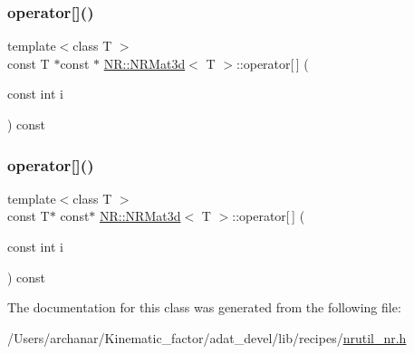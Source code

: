 \mbox{\label{classNR_1_1NRMat3d_a93f8b186294e7a585b46a1bf3c5028cc}} 
\subsubsection{\texorpdfstring{operator[]()}{operator[]()}\hspace{0.1cm}{\footnotesize\ttfamily [3/4]}}
{\footnotesize\ttfamily template$<$class T $>$ \\
const T $\ast$const  $\ast$ \mbox{\hyperlink{classNR_1_1NRMat3d}{N\+R\+::\+N\+R\+Mat3d}}$<$ T $>$\+::operator\mbox{[}$\,$\mbox{]} (\begin{DoxyParamCaption}\item[{const int}]{i }\end{DoxyParamCaption}) const\hspace{0.3cm}{\ttfamily [inline]}}

\mbox{\label{classNR_1_1NRMat3d_a17f8d263fbe8876a2219cc1a4bdac0ca}} 
\subsubsection{\texorpdfstring{operator[]()}{operator[]()}\hspace{0.1cm}{\footnotesize\ttfamily [4/4]}}
{\footnotesize\ttfamily template$<$class T $>$ \\
const T$\ast$ const$\ast$ \mbox{\hyperlink{classNR_1_1NRMat3d}{N\+R\+::\+N\+R\+Mat3d}}$<$ T $>$\+::operator\mbox{[}$\,$\mbox{]} (\begin{DoxyParamCaption}\item[{const int}]{i }\end{DoxyParamCaption}) const\hspace{0.3cm}{\ttfamily [inline]}}



The documentation for this class was generated from the following file\+:\begin{DoxyCompactItemize}
\item 
/\+Users/archanar/\+Kinematic\+\_\+factor/adat\+\_\+devel/lib/recipes/\mbox{\hyperlink{lib_2recipes_2nrutil__nr_8h}{nrutil\+\_\+nr.\+h}}\end{DoxyCompactItemize}
